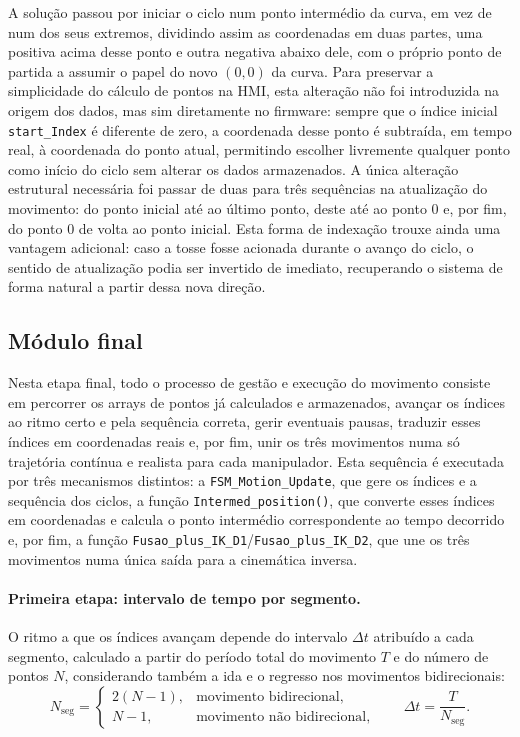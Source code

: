 A solução passou por iniciar o ciclo num ponto intermédio da curva, em vez de num dos seus extremos, dividindo assim as coordenadas em duas partes, uma positiva acima desse ponto e outra negativa abaixo dele, com o próprio ponto de partida a assumir o papel do novo \((0,0)\) da curva. Para preservar a simplicidade do cálculo de pontos na HMI, esta alteração não foi introduzida na origem dos dados, mas sim diretamente no firmware: sempre que o índice inicial \texttt{start\_Index} é diferente de zero, a coordenada desse ponto é subtraída, em tempo real, à coordenada do ponto atual, permitindo escolher livremente qualquer ponto como início do ciclo sem alterar os dados armazenados. A única alteração estrutural necessária foi passar de duas para três sequências na atualização do movimento: do ponto inicial até ao último ponto, deste até ao ponto \(0\) e, por fim, do ponto \(0\) de volta ao ponto inicial. Esta forma de indexação trouxe ainda uma vantagem adicional: caso a tosse fosse acionada durante o avanço do ciclo, o sentido de atualização podia ser invertido de imediato, recuperando o sistema de forma natural a partir dessa nova direção.

\subsection{Módulo final}\label{subsec:modulo-final-execucao}
Nesta etapa final, todo o processo de gestão e execução do movimento consiste em percorrer os arrays de pontos já calculados e armazenados, avançar os índices ao ritmo certo e pela sequência correta, gerir eventuais pausas, traduzir esses índices em coordenadas reais e, por fim, unir os três movimentos numa só trajetória contínua e realista para cada manipulador. Esta sequência é executada por três mecanismos distintos: a \texttt{FSM\_Motion\_Update}, que gere os índices e a sequência dos ciclos, a função \texttt{Intermed\_position()}, que converte esses índices em coordenadas e calcula o ponto intermédio correspondente ao tempo decorrido e, por fim, a função \texttt{Fusao\_plus\_IK\_D1}/\texttt{Fusao\_plus\_IK\_D2}, que une os três movimentos numa única saída para a cinemática inversa.

\paragraph{Primeira etapa: intervalo de tempo por segmento.}
O ritmo a que os índices avançam depende do intervalo \(\Delta t\) atribuído a cada segmento, calculado a partir do período total do movimento \(T\) e do número de pontos \(N\), considerando também a ida e o regresso nos movimentos bidirecionais:
\begin{equation}
  N_{\mathrm{seg}} =
  \begin{cases}
    2(N-1), & \text{movimento bidirecional},\\
    N-1, & \text{movimento não bidirecional},
  \end{cases}
  \qquad
  \Delta t = \frac{T}{N_{\mathrm{seg}}}.
\end{equation}

